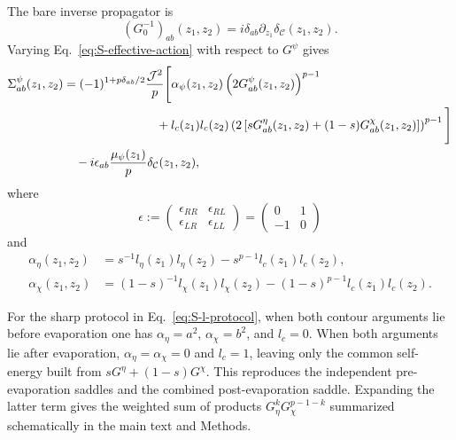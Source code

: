 \documentclass[11pt,a4paper]{article}
\begin{document}
The bare inverse propagator is
\begin{equation}
(G_0^{-1})_{ab}(z_1,z_2)
=
i\delta_{ab}\partial_{z_1}
\delta_{\mathcal C}(z_1,z_2).
\label{eq:S-bare-inverse-propagator}
\end{equation}
Varying Eq.~\eqref{eq:S-effective-action} with respect to \(G^\psi\) gives
\begin{equation}
\begin{aligned}
\Sigma^\psi_{ab}(z_1,z_2)
&=
(-1)^{1+p\delta_{ab}/2}
\frac{\mathcal J^2}{p}
\Bigg[
\alpha_\psi(z_1,z_2)
\left(2G^\psi_{ab}(z_1,z_2)\right)^{p-1}
\\
&\hspace{2.7cm}
+l_c(z_1)l_c(z_2)
\left(
2\left[
sG^\eta_{ab}(z_1,z_2)
+(1-s)G^\chi_{ab}(z_1,z_2)
\right]
\right)^{p-1}
\Bigg]
\\
&\quad
-i\epsilon_{ab}
\frac{\mu_\psi(z_1)}{p}
\delta_{\mathcal C}(z_1,z_2),
\end{aligned}
\label{eq:S-self-energy}
\end{equation}
where
\begin{equation}
\epsilon :=
\begin{pmatrix}
\epsilon_{RR} & \epsilon_{RL} \\
\epsilon_{LR}  & \epsilon_{LL}
\end{pmatrix}
=
\begin{pmatrix}
0&1\\
-1&0
\end{pmatrix}
\label{eq:S-epsilon}
\end{equation}
and
\begin{equation}
\begin{aligned}
\alpha_\eta(z_1,z_2)
&=
s^{-1}l_\eta(z_1)l_\eta(z_2)
-s^{p-1}l_c(z_1)l_c(z_2),
\\
\alpha_\chi(z_1,z_2)
&=
(1-s)^{-1}l_\chi(z_1)l_\chi(z_2)
-(1-s)^{p-1}l_c(z_1)l_c(z_2).
\end{aligned}
\label{eq:S-alpha}
\end{equation}

For the sharp protocol in Eq.~\eqref{eq:S-l-protocol}, when both contour
arguments lie before evaporation one has
\(\alpha_\eta=a^2\), \(\alpha_\chi=b^2\), and \(l_c=0\). When both arguments
lie after evaporation, \(\alpha_\eta=\alpha_\chi=0\) and \(l_c=1\), leaving
only the common self-energy built from
\(sG^\eta+(1-s)G^\chi\). This reproduces the independent pre-evaporation
saddles and the combined post-evaporation saddle. Expanding the latter term
gives the weighted sum of products \(G_\eta^kG_\chi^{p-1-k}\) summarized
schematically in the main text and Methods.
\end{document}
